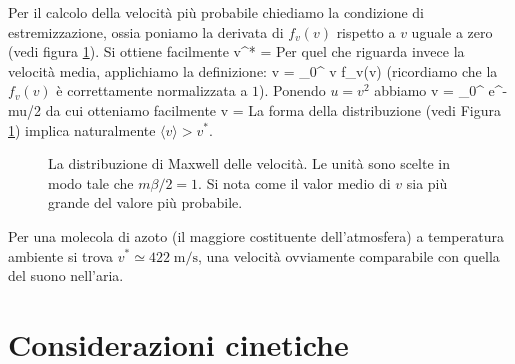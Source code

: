 Per il calcolo della velocità più probabile chiediamo la condizione di estremizzazione, ossia poniamo la derivata di $f_{v}(v)$ rispetto a $v$ uguale a zero (vedi figura \ref{fig:maxwell}). Si ottiene facilmente
%
\be
v^{*} = 
\ee
%
Per quel che riguarda invece la velocità media, applichiamo la definizione:
%
\be
\langle v \rangle = \int_{0}^{\infty} \; v f_{v}(v)
\ee
%
(ricordiamo che la $f_{v}(v)$ è correttamente normalizzata a $1$). Ponendo $u = v^{2}$ abbiamo
%
\be
\langle v \rangle = \int_{0}^{\infty} \; e^{-\beta mu/2}
\ee
%
da cui otteniamo facilmente
%
\be
\label{eq:vmediaMB}
\langle v \rangle = 
\ee
%
La forma della distribuzione (vedi Figura \ref{fig:maxwell}) implica naturalmente $\langle v \rangle > v^{*}$.

\begin{figure}[!ht]
  \centering
{}   
  \caption{La distribuzione di Maxwell delle velocità. Le unità sono scelte in modo tale che $m\beta/2 = 1$. Si nota come il valor medio di $v$ sia più grande del valore più probabile.}
  \label{fig:maxwell}
\end{figure}

Per una molecola di azoto (il maggiore costituente dell'atmosfera) a temperatura ambiente si trova $v^{*} \simeq 422\;\mbox{m/s}$, una velocità ovviamente comparabile con quella del suono nell'aria.

\section{Considerazioni cinetiche}
\label{sec:conskin}

